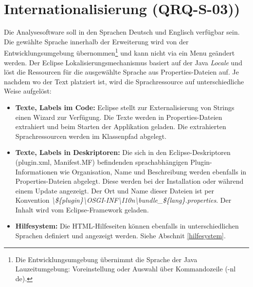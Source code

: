 \section{Internationalisierung (QRQ-S-03))}
Die Analysesoftware soll in den Sprachen Deutsch und Englisch verfügbar sein. Die gewählte Sprache innerhalb der Erweiterung wird von der Entwicklungsumgebung übernommen\footnote{Die Entwicklungsumgebung übernimmt die Sprache der Java Lauzeitumgebung: Voreinstellung oder Auswahl über Kommandozeile (-nl de). } und kann nicht via ein Menu geändert werden. 
Der Eclipse Lokalisierungsmechanismus basiert auf der Java \textit{Locale} und löst die Ressourcen für die ausgewählte Sprache aus Properties-Dateien auf. Je nachdem wo der Text platziert ist, wird die Sprachressource auf unterschiedliche Weise aufgelöst:
\begin{itemize}
	\item \textbf{Texte, Labels im Code:} Eclipse stellt zur Externalisierung von Strings einen Wizard zur Verfügung. Die Texte werden in Properties-Dateien extrahiert und beim Starten der Applikation geladen. Die extrahierten Sprachressourcen werden im Klassenpfad abgelegt.

	\item \textbf{Texte, Labels in Deskriptoren:} Die sich in den Eclipse-Deskriptoren (plugin.xml, Manifest.MF) befindenden sprachabhängigen Plugin-Informationen wie Organisation, Name und Beschreibung werden ebenfalls in Properties-Dateien abgelegt. Diese werden bei der Installation oder während einem Update angezeigt. Der Ort und Name dieser Dateien ist per Konvention \textit{\textbackslash \$\{plugin\}\textbackslash OSGI-INF\textbackslash I10n\textbackslash bundle\_\$\{lang\}.properties}. Der Inhalt wird vom Eclipse-Framework geladen.

	\item \textbf{Hilfesystem:} Die HTML-Hilfeseiten können ebenfalls in unterschiedlichen Sprachen definiert und angezeigt werden. Siehe Abschnit \ref{hilfesystem}.
\end{itemize} 

